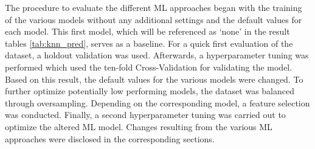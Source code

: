 The procedure to evaluate the different ML approaches began with the training of the various models without any additional settings and the default values for each model. This first model, which will be referenced as \enquote*{none} in the result tables \ref{tab:knn_pred}, serves as a baseline. For a quick first evaluation of the dataset, a holdout validation was used. Afterwards, a hyperparameter tuning was performed which used the ten-fold Cross-Validation for validating the model. %
Based on this result, the default values for the various models were changed. To further optimize potentially low performing models, the dataset was balanced through oversampling. Depending on the corresponding model, a feature selection was conducted. Finally, a second hyperparameter tuning was carried out to optimize the altered ML model. Changes resulting from the various ML approaches were disclosed in the corresponding sections.



